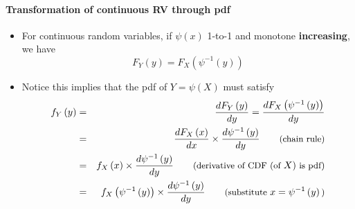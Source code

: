 \documentclass[notes=show,smaller,handout]{beamer}\usepackage[]{graphicx}\usepackage[]{color}
\newenvironment{stepitemize}{\begin{itemize}[<+->]}{\end{itemize} }
\begin{document}
\begin{frame}{\secname}
  \framesubtitle{Transformation of continuous RV through pdf}

  \begin{stepitemize}
  \item For continuous random variables, if $\psi \left( x\right) $ 1-to-1 and
  monotone \textbf{increasing}, we have%
  \begin{equation*}
  F_{Y}\left( y\right) =F_{X}\left( \psi ^{-1}\left( y\right) \right)
  \end{equation*}

  \item Notice this implies that the pdf of $Y=\psi \left( X\right) $ must
  satisfy%
  \begin{eqnarray*}
  f_{Y}\left( y\right) &=&\frac{dF_{Y}\left( y\right) }{dy}=\frac{dF_{X}\left(
  \psi ^{-1}\left( y\right) \right) }{dy} \\
  &=&\frac{dF_{X}\left( x\right) }{dx}\times \frac{d\psi ^{-1}\left( y\right)
  }{dy}\qquad \text{{\small (chain rule)}} \\
  &=&f_{X}\left( x\right) \times \frac{d\psi ^{-1}\left( y\right) }{dy}\qquad
  \text{{\small (derivative of CDF (of }}X\text{){\small \ is pdf)}} \\
  &=&f_{X}\left( \psi ^{-1}\left( y\right) \right) \times \frac{d\psi
  ^{-1}\left( y\right) }{dy}\qquad \text{{\small (substitute }}x=\psi
  ^{-1}\left( y\right) \text{{\small )}}
  \end{eqnarray*}
  \end{stepitemize}

\end{frame}
\end{document}
